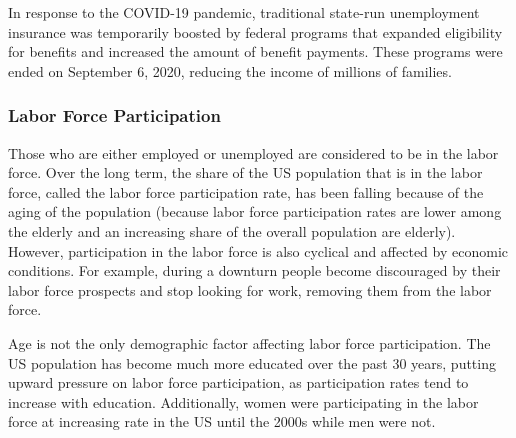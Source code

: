 \documentclass{report}
\begin{document}
{{\begin{minipage}{0.76\textwidth}
\small In response to the COVID-19 pandemic, traditional state-run unemployment insurance was temporarily boosted by federal programs that expanded eligibility for benefits and increased the amount of benefit payments. These programs were ended on September 6, 2020, reducing the income of millions of families. 

%

\end{minipage}
\newpage
\begin{minipage}{0.76\textwidth}
\subsubsection*{\color{black!70} \seriffont Labor Force Participation}
\small Those who are either employed or unemployed are considered to be in the labor force. Over the long term, the share of the US population that is in the labor force, called the labor force participation rate, has been falling because of the aging of the population (because labor force participation rates are lower among the elderly and an increasing share of the overall population are elderly). However, participation in the labor force is also cyclical and affected by economic conditions. For example, during a downturn people become discouraged by their labor force prospects and stop looking for work, removing them from the labor force.

Age is not the only demographic factor affecting labor force participation. The US population has become much more educated over the past 30 years, putting upward pressure on labor force participation, as participation rates tend to increase with education. Additionally, women were participating in the labor force at increasing rate in the US until the 2000s while men were not.




\vspace{1mm}


\end{minipage}}}
\end{document}
